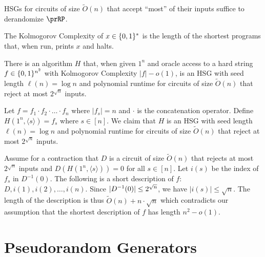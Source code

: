 \begin{theorem}
    HSGs for circuits of size $\widetilde{O}(n)$ that accept ``most'' of their inputs 
    suffice to derandomize $\prRP$.
\end{theorem}


\begin{definition}
    The Kolmogorov Complexity of $x \in \{0, 1\}^*$ is the length of the shortest 
    programs that, when run, prints $x$ and halts.
\end{definition}

\begin{theorem}
    There is an algorithm $H$ that, when given $1^n$ and oracle access to a hard 
    string $f \in \{0, 1\}^{n^2}$ with Kolmogorov Complexity $|f| - o(1)$, is 
    an HSG with seed length $\ell(n) = \log{n}$ and polynomial runtime for circuits 
    of size $\widetilde{O}(n)$ that reject at most $2^{\sqrt{n}}$ inputs.
\end{theorem}

\begin{proofsk}
    Let $f = f_1 \cdot f_2 \cdot \ldots \cdot f_n$ where $|f_s| = n$ and $\cdot$ is the 
    concatenation operator.
    Define $H(1^n, \langle s \rangle) = f_s$ where $s \in [n]$.
    We claim that $H$ is an HSG with seed length $\ell(n) = \log{n}$ and polynomial 
    runtime for circuits of size $\widetilde{O}(n)$ that reject at most $2^{\sqrt{n}}$ 
    inputs.

    Assume for a contraction that $D$ is a circuit of size $\widetilde{O}(n)$ that 
    rejects at most $2^{\sqrt{n}}$ inputs and $D(H(1^n, \langle s \rangle)) = 0$ for 
    all $s \in [n]$.
    Let $i(s)$ be the index of $f_s$ in $D^{-1}(0)$.
    The following is a short description of $f$: $D, i(1), i(2), \dots, i(n)$.
    Since $\lvert D^{-1}(0)\rvert \leq 2^{\sqrt{n}}$, we have $|i(s)| \leq \sqrt{n}$.
    The length of the description is thus $\widetilde{O}(n) + n \cdot \sqrt{n}$ which 
    contradicts our assumption that the shortest description of $f$ has length $n^2 - 
    o(1)$.

\end{proofsk}

\section{Pseudorandom Generators}


